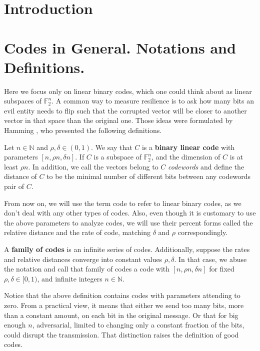   \section{Introduction}
  
  \section{Codes in General. Notations and Definitions.}
  Here we focus only on linear binary codes, which one could think about as linear subspaces of $\mathbb{F}_{2}^{n}$. A common way to measure resilience is to ask how many bits an evil entity needs to flip such that the corrupted vector will be closer to another vector in that space than the original one. Those ideas were formulated by Hamming \cite{Hamming}, who presented the following definitions. 
  \begin{definition} \label{bi-code} Let $n \in \mathbb{N}$ and $\rho, \delta\in \left( 0,1 \right)$. We say that $C$ is a \textbf{binary linear code} with parameters $[n, \rho n, \delta n]$. If $C$ is a subspace of $\mathbb{F}_{2}^{n}$, and the dimension of $C$ is at least $\rho n$. In addition, we call the vectors belong to $C$ \textit{codewords} and define the distance of $C$ to be the minimal number of different bits between any codewords pair of $C$.   
  \end{definition}
  From now on, we will use the term code to refer to linear binary codes, as we don't deal with any other types of codes. Also, even though it is customary to use the above parameters to analyze codes, we will use their percent forms called the relative distance and the rate of code, matching $\delta$ and $\rho$ correspondingly.     
  \begin{definition} \label{family} A \textbf{family of codes} is an infinite series of codes. Additionally, suppose the rates and relative distances converge into constant values $\rho,\delta$. In that case, we abuse the notation and call that family of codes a code with $[n, \rho n, \delta n]$ for fixed $\rho, \delta\in [ 0,1 )$, and infinite integers $n \in \mathbb{N}$.     
  \end{definition}
  Notice that the above definition contains codes with parameters attending to zero. From a practical view, it means that either we send too many bits, more than a constant amount, on each bit in the original message. Or that for big enough $n$, adversarial, limited to changing only a constant fraction of the bits, could disrupt the transmission. That distinction raises the definition of good codes.


